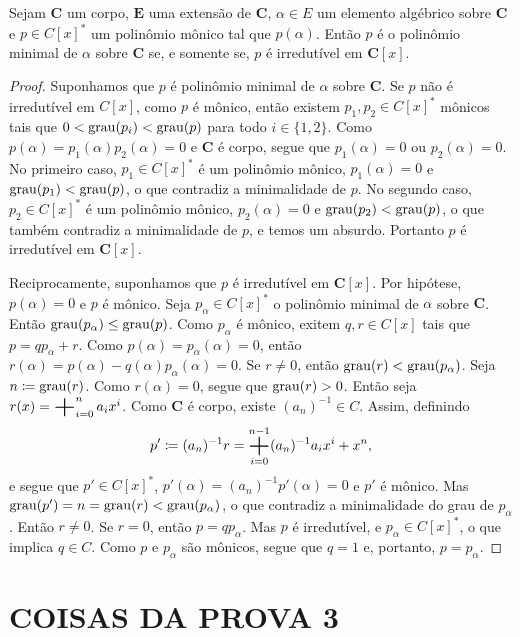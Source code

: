 \begin{prop}
	Sejam $\bm C$ um corpo, $\bm E$ uma extensão de $\bm C$, $\alpha \in E$ um elemento algébrico sobre $\bm C$ e $p \in C[x]^*$ um polinômio mônico tal que $p(\alpha)$. Então $p$ é o polinômio minimal de $\alpha$ sobre $\bm C$ se, e somente se, $p$ é irredutível em $\bm C[x]$.
\end{prop}
\begin{proof}
	Suponhamos que $p$ é polinômio minimal de $\alpha$ sobre $\bm C$. Se $p$ não é irredutível em $C[x]$, como $p$ é mônico, então existem $p_1,p_2 \in C[x]^*$ mônicos tais que $0 < \operatorname{grau}(p_i) < \operatorname{grau}(p)$ para todo $i \in \{1,2\}$. Como $p(\alpha)=p_1(\alpha)p_2(\alpha)=0$ e $\bm C$ é corpo, segue que $p_1(\alpha)=0$ ou $p_2(\alpha)=0$. No primeiro caso, $p_1 \in C[x]^*$ é um polinômio mônico, $p_1(\alpha)=0$ e $\operatorname{grau}(p_1) < \operatorname{grau}(p)$, o que contradiz a minimalidade de $p$. No segundo caso, $p_2 \in C[x]^*$ é um polinômio mônico, $p_2(\alpha)=0$ e $\operatorname{grau}(p_2) < \operatorname{grau}(p)$, o que também contradiz a minimalidade de $p$, e temos um absurdo. Portanto $p$ é irredutível em $\bm C[x]$.

	Reciprocamente, suponhamos que $p$ é irredutível em $\bm C[x]$. Por hipótese, $p(\alpha)=0$ e $p$ é mônico. Seja $p_\alpha \in C[x]^*$ o polinômio minimal de $\alpha$ sobre $\bm C$. Então $\operatorname{grau}(p_\alpha) \leq \operatorname{grau}(p)$. Como $p_\alpha$ é mônico, exitem $q,r \in C[x]$ tais que $p = qp_\alpha+r$. Como $p(\alpha) = p_\alpha(\alpha) = 0$, então $r(\alpha) = p(\alpha) - q(\alpha)p_\alpha(\alpha) = 0$. Se $r \neq 0$, então $\operatorname{grau}(r) < \operatorname{grau}(p_\alpha)$. Seja $n \coloneqq \operatorname{grau}(r)$. Como $r(\alpha)=0$, segue que $\operatorname{grau}(r)>0$. Então seja $r(x) = \bigsum_{i=0}^n a_ix^i$. Como $\bm C$ é corpo, existe $(a_n)^{-1} \in C$. Assim, definindo
	\begin{equation*}
	p' \coloneqq (a_n)^{-1}r = \bigsum_{i=0}^{n-1} (a_n)^{-1}a_ix^i + x^n,
	\end{equation*}
e segue que $p' \in C[x]^*$, $p'(\alpha)=(a_n)^{-1}p'(\alpha)=0$ e $p'$ é mônico. Mas $\operatorname{grau}(p') = n = \operatorname{grau}(r) < \operatorname{grau}(p_\alpha)$, o que contradiz a minimalidade do grau de $p_\alpha$. Então $r \neq 0$. Se $r=0$, então $p=qp_\alpha$. Mas $p$ é irredutível, e $p_\alpha \in C[x]^*$, o que implica $q \in C$. Como $p$ e $p_\alpha$ são mônicos, segue que $q=1$ e, portanto, $p=p_\alpha$.
\end{proof}



\section{COISAS DA PROVA 3}

